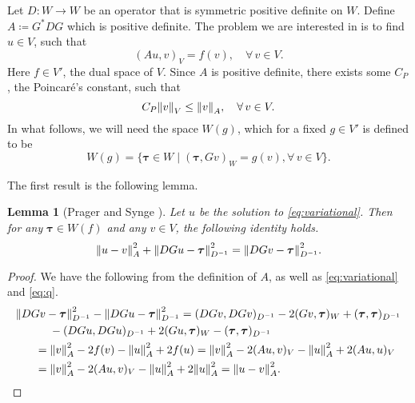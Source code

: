 \documentclass[ ]{elsarticle}
\newcommand{\mforall}{\forall\,}
\newcommand{\Grad}{G}
\newcommand{\Div}{G^*}
\newcommand{\vsp}{V}
\newcommand{\esp}{W}
\newcommand{\norm}[1]{\left\lVert#1\right\rVert}
\newcommand{\Poincare}{Poincar\'{e}}
\let\originalleft\left
\let\originalright\right
\renewcommand{\left}{\mathopen{}\mathclose\bgroup\originalleft}
\renewcommand{\right}{\aftergroup\egroup\originalright}
\newtheorem{lemma}[theorem]{Lemma}
\numberwithin{equation}{section}
\newcommand{\red}[1]{#1}
\begin{document}
Let $D\colon\esp\to\esp$ be an operator that is \red{symmetric
  positive definite on $\esp$}. Define $A \coloneqq \Div D\Grad$ which
is positive definite. The problem we are interested in is to find
$u\in\vsp$, such that
\begin{equation}\label{eq:variational}
  (Au,v)_\vsp=f(v),\quad\mforall v\in\vsp.
\end{equation}
Here $f\in \vsp'$, the dual space of $\vsp$. Since $A$ is positive
definite, there exists some $C_P$, the \Poincare's constant, such that
\begin{equation*}
  C_P\norm{v}_\vsp\leq\norm{v}_A, \quad \mforall v\in\vsp.
\end{equation*}
In what follows, we will need the space $\esp(g)$, which for a fixed
$g\in \vsp'$ is defined to be
\begin{equation}\label{eq:q}
  \esp(g) = \{ \bm\tau\in\esp \mid (\bm\tau,\Grad v)_\esp = g(v),
  \mforall v\in\vsp \}.
\end{equation}

The first result is the following lemma.
\begin{lemma}[Prager and Synge \cite{1947PragerW_SyngeJ-aa}]
  \label{lem:Prager-Synge}
  Let $u$ be the solution to \eqref{eq:variational}. Then for any
  $\bm\tau\in\esp(f)$ and any $v\in\vsp$, the following identity
  holds.
  \begin{equation}\label{eq:Prager-Synge}
    \norm{u-v}^2_A + \norm{D\Grad u-\bm\tau}^2_{D^{-1}} = \norm{D\Grad v-\bm\tau}^2_{D^{-1}}.
  \end{equation}
\end{lemma}
\begin{proof}
  We have the following from the definition of $A$, as well as
  \eqref{eq:variational} and \eqref{eq:q}.
  \begin{align*}
    & \norm{D\Grad v-\bm\tau}^2_{D^{-1}}-\norm{D\Grad u-\bm\tau}^2_{D^{-1}}
      = (D\Grad v,D\Grad v)_{D^{-1}}-2(\Grad v,\bm\tau)_\esp+(\bm\tau,\bm\tau)_{D^{-1}} \\
    & \hspace{7ex} -(D\Grad u,D\Grad u)_{D^{-1}}+2(\Grad u,\bm\tau)_\esp-(\bm\tau,\bm\tau)_{D^{-1}} \\
    & \hspace{4ex} = \norm{v}_A^2-2f(v)-\norm{u}_A^2+2f(u)=\norm{v}_A^2-2(Au,v)_\vsp-\norm{u}_A^2+2(Au,u)_\vsp \\
    & \hspace{4ex} = \norm{v}_A^2-2(Au,v)_\vsp-\norm{u}_A^2+2\norm{u}_A^2=\norm{u-v}_A^2. \qedhere
  \end{align*}
\end{proof}
\end{document}
